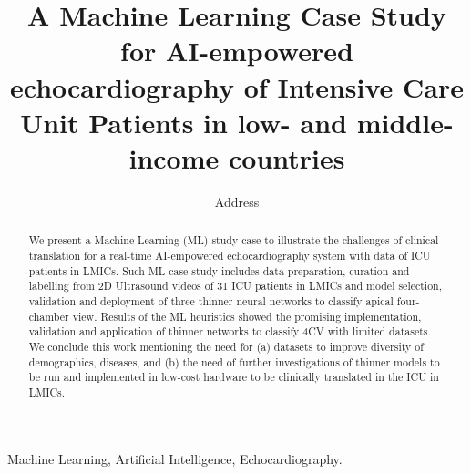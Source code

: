 \documentclass[mlabstract,twocolumn]{jmlr}
\title[Short Title]{
A Machine Learning Case Study for AI-empowered echocardiography of Intensive Care Unit Patients in low- and middle-income countries  %
}
\author{
     \Name{Anonymous Author(s)} \Email{email@sample.com}
      \addr Address
   }
\begin{document}
\maketitle

\begin{abstract}
We present a Machine Learning (ML) study case to illustrate the challenges of clinical translation for a real-time AI-empowered echocardiography system with data of ICU patients in LMICs.
Such ML case study includes data preparation, curation and labelling from 2D Ultrasound videos of 31 ICU patients in LMICs and model selection, validation and deployment of three thinner neural networks to classify apical four-chamber view.
Results of the ML heuristics showed the promising implementation, validation and application of thinner networks to classify 4CV with limited datasets.
We conclude this work mentioning the need for (a) datasets to improve diversity of demographics, diseases, and (b) the need of further investigations of thinner models to be run and implemented in low-cost hardware to be clinically translated in the ICU in LMICs.
\end{abstract}
\begin{keywords}
Machine Learning, Artificial Intelligence, Echocardiography.
\end{keywords}
\end{document}
